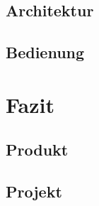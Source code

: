 \documentclass[a4paper, 12pt]{scrartcl}
\begin{document}
    \subsection{Architektur}
    
    \subsection{Bedienung}
    \section{Fazit}
    \subsection{Produkt}
    \subsection{Projekt}
    
\end{document}
